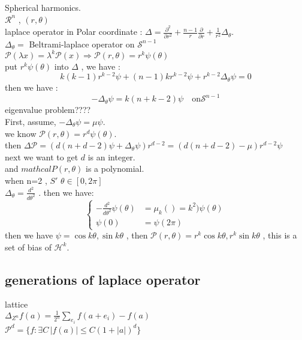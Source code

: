Spherical harmonics.
\\
$\mathcal{R}^n$ , $(r,\theta)$
\\
laplace operator in Polar coordinate :
$\Delta = \frac{\partial^2}{\partial r^2}+\frac{n-1}{r}\frac{\partial}{\partial r}+\frac{1}{r^2}\Delta_{\theta}$.
\\
$\Delta_{\theta}=$ Beltrami-laplace operator on $\mathcal{S}^{n-1}$
\\
$\mathcal{P}(\lambda x)=\lambda^k\mathcal{P}(x)\Rightarrow \mathcal P(r,\theta)=r^k\psi(\theta)$
\\
put $r^k\psi(\theta)$ into $\Delta$ , we have :
\begin{equation*}
    k(k-1)r^{k-2}\psi+(n-1)kr^{k-2}\psi+r^{k-2}\Delta_{\theta}\psi=0
\end{equation*}
then we have :
\begin{equation*}
    -\Delta_{\theta}\psi=k(n+k-2)\psi\quad \text{on} \mathcal{S}^{n-1}
\end{equation*}
eigenvalue problem????
\\
First, assume, $-\Delta_{\theta}\psi=\mu\psi$.
\\
we know $\mathcal{P}(r,\theta)=r^d\psi(\theta)$.
\\
then $\Delta \mathcal{P}=\left(d(n+d-2)\psi+\Delta_{\theta}\psi\right)r^{d-2}=\left(d(n+d-2)-\mu\right)r^{d-2}\psi$
\\
next we want to get $d$ is an integer.
\\
and $mathcal{P}(r,\theta)$ is a polynomial.
\\
when n=2  , $S'$ $\theta\in[0,2\pi]$
\\
$\Delta_{\theta}=\frac{d^2}{d\theta^2}$ . then we have:
\begin{equation*}
    \begin{cases}
        -\frac{d^2}{d\theta^2}\psi(\theta)&=\mu_{k}()=k^2)\psi(\theta)\\
        \psi(0)&=\psi(2\pi)
    \end{cases}
\end{equation*}
then we have $\psi=\cos{k\theta},\sin{k\theta}$ , then $\mathcal{P}(r,\theta)=r^k\cos{k\theta},r^k\sin{k\theta}$ , this is a set of bias of $\mathcal{H}^k$.
\subsection{generations of laplace operator}
lattice
\\
$\Delta_{Z^n}f(a)=\frac{1}{2^n}\sum_{e_i}f(a+e_i)-f(a)$
\\
$\mathcal{P}^d=\{f:\exists C \, |f(a)|\leq C(1+|a|)^d\}$
\\
